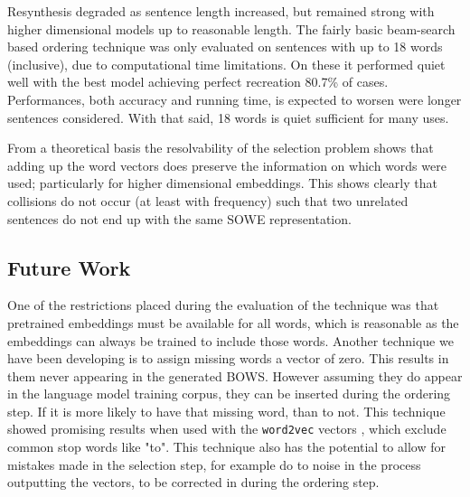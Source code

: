 \documentclass[11pt]{article}
\theoremstyle{plain}
\theoremstyle{definition}
\begin{document}
Resynthesis degraded as sentence length increased, but remained strong with higher dimensional models up to reasonable length. The fairly basic beam-search based ordering technique was only evaluated on sentences with up to 18 words (inclusive), due to computational time limitations. On these it performed quiet well with the best model achieving perfect recreation 80.7\% of cases. Performances, both accuracy and running time, is expected to worsen were longer sentences considered. With that said, 18 words is quiet sufficient for many uses.

From a theoretical basis the resolvability of the selection problem shows that adding up the word vectors does preserve the information on which words were used; particularly for higher dimensional embeddings. This shows clearly that collisions do not occur (at least with frequency) such that two unrelated sentences do not end up with the same SOWE representation. 

\subsection{Future Work}\label{future}
One of the restrictions placed during the evaluation of the technique was that pretrained embeddings must be available for all words, which is reasonable as the embeddings can always be trained to include those words. Another technique we have been developing is to assign missing words a vector of zero. This results in them never appearing in the generated BOWS. However assuming they do appear in the language model training corpus, they can be inserted during the ordering step. If it is more likely to have that missing word, than to not. This technique showed promising results when used with the \texttt{word2vec} vectors \parencite{mikolovSkip}, which exclude common stop words like "to". This technique also has the potential to allow for mistakes made in the selection step, for example do to noise in the process outputting the vectors, to be corrected in during the ordering step.




\printbibliography
	
\end{document}
